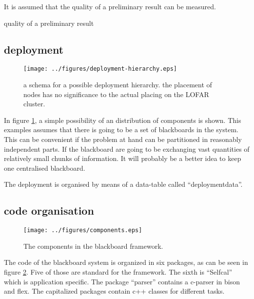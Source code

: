 \documentclass[]{lofar}
\begin{document}
          \begin{assumption}
            It is assumed that the quality of a preliminary result can be
            measured.\footnotemark[\value{footnote}]
            \caption{ quality of a preliminary result\label{ass:quality}}
          \end{assumption}

    \subsection{deployment}

      \begin{figure}
        \texttt{[image: ../figures/deployment-hierarchy.eps]}
        \hypertarget{fig:deployment-hierarchy}{}
        \caption{a schema for a possible deployment hierarchy. the
        placement of nodes has no significance to the actual placing on
        the LOFAR cluster.\label{fig:deployment-hierarchy}}
      \end{figure}

      In figure
      \hyperlink{fig:deployment-hierarchy}{\ref{fig:deployment-hierarchy}},
      a simple possibility of an distribution of components is
      shown. This examples assumes that there is going to be a set of
      blackboards in the system. This can be convenient if the problem
      at hand can be partitioned in reasonably independent parts. If
      the blackboard are going to be exchanging vast quantities of
      relatively small chunks of information. It will probably be a
      better idea to keep one centralised blackboard.

      The deployment is organised by means of a data-table called
      ``deploymentdata''.

    \subsection{code organisation}

      \begin{figure}
        \texttt{[image: ../figures/components.eps]}
        \hypertarget{fig:components}{}
        \caption{The components in the blackboard framework.\label{fig:components}}
      \end{figure}

      The code of the blackboard system is organized in six packages,
      as can be seen in figure
      \hyperlink{fig:components}{\ref{fig:components}}. Five of those
      are standard for the framework. The sixth is ``Selfcal'' which
      is application specific. The package ``parser'' contains a
      c-parser in bison and flex. The capitalized packages contain c++
      classes for different tasks.
\end{document}
